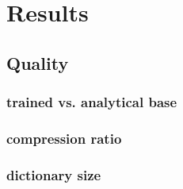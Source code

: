 \chapter{Results}

\section{Quality}
\subsection{trained vs. analytical base}
\subsection{compression ratio}
\subsection{dictionary size}




